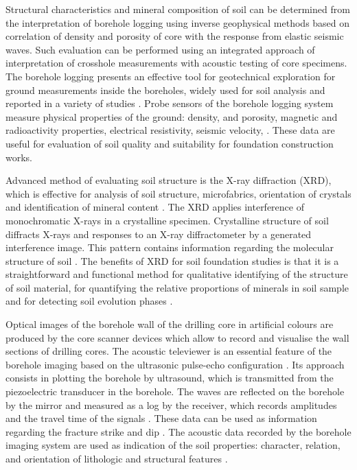 \documentclass[USenglish,twocolumn]{article}
\begin{document}
Structural characteristics and mineral composition of soil can be determined from the interpretation of borehole logging using inverse geophysical methods based on correlation of density and porosity of core with the response from elastic seismic waves. Such evaluation can be performed using an integrated approach of interpretation of crosshole measurements with acoustic testing of core specimens. The borehole logging presents an effective tool for geotechnical exploration for ground measurements inside the boreholes, widely used for soil analysis and reported in a variety of studies \cite{KALERIS2015135,DIAS2020107099,YU2022127817,YU2021126010}. Probe sensors of the borehole logging system measure physical properties of the ground: density, and porosity, magnetic and radioactivity properties, electrical resistivity, seismic velocity, 
\cite{KILLEEN2015447}. These data are useful for evaluation of soil quality and suitability for foundation construction works.

Advanced method of evaluating soil structure is the X-ray diffraction (XRD), which is effective for analysis of soil structure, microfabrics, orientation of crystals and identification of mineral content \cite{Denaix,Das,Righi}. The XRD applies interference of monochromatic X-rays in a crystalline specimen. Crystalline structure of soil diffracts X-rays and responses to an X-ray diffractometer by a generated interference image. This pattern contains information regarding the molecular structure of soil \cite{ALDERTON2021520}. The benefits of XRD for soil foundation studies is that it is a straightforward and functional method for  qualitative identifying of the structure of soil material, for quantifying the relative proportions of minerals in soil sample  and for detecting soil evolution phases \cite{ADAMS2019391}.

Optical images of the borehole wall of the drilling core in artificial colours are produced by the core scanner devices which allow to record and visualise the wall sections of drilling cores. The acoustic televiewer is an essential feature of the borehole imaging based on the ultrasonic pulse-echo configuration \cite{paillet1990borehole}. Its approach consists in plotting the borehole by ultrasound, which is transmitted from the piezoelectric transducer in the borehole. The waves are reflected on the borehole by the mirror and measured as a log by the receiver, which records amplitudes and the travel time of the signals \cite{RONQUILLOJARILLO20181}. These data can be used as information regarding the fracture strike and dip \cite{Paillet}. The acoustic data recorded by the borehole imaging system are used as indication of the soil properties: character, relation, and orientation of lithologic and structural features \cite{WILLIAMS2004151}. 
\end{document}
